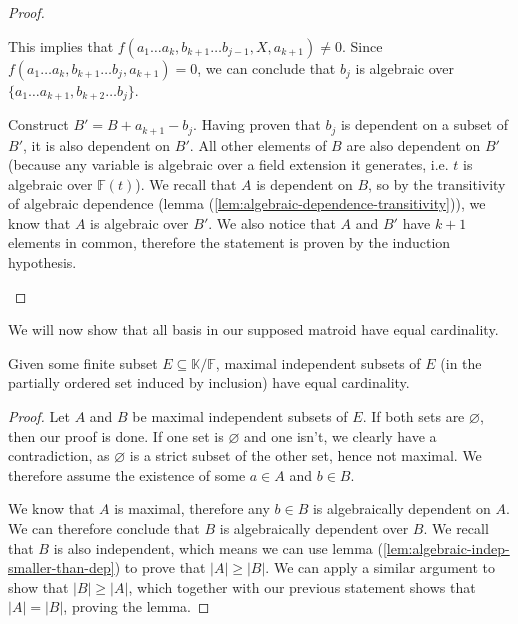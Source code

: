 \begin{proof}
\begin{enumerate}
		      This implies that $f(a _1 \ldots a _k, b _{k + 1} \ldots b _{j - 1}, X, a _{k + 1}) \neq 0$. Since $ f(a _1 \ldots a _{k}, b _{k + 1} \ldots b _{j}, a _{k + 1})  = 0$, we can conclude that $b_j$ is algebraic over $\{a _1 \ldots a _{k + 1}, b _{k + 2} \ldots b _j\}$.

		      Construct $B' = B + a _{k + 1} - b_j$. Having proven that $b_j$ is dependent on a subset of $B'$, it is also dependent on $B'$. All other elements of $B$ are also dependent on $B'$ (because any variable is algebraic over a field extension it generates, i.e. $t$ is algebraic over $\mathbb F(t)$). We recall that $A$ is dependent on $B$, so by the transitivity of algebraic dependence (lemma (\ref{lem:algebraic-dependence-transitivity})), we know that $A$ is algebraic over $B'$. We also notice that $A$ and $B'$ have $k + 1$ elements in common, therefore the statement is proven by the induction hypothesis.
	\end{enumerate}
\end{proof}

We will now show that all basis in our supposed matroid have equal cardinality.

\begin{lemma}
	Given some finite subset $E \subseteq \mathbb K / \mathbb F$, maximal independent subsets of $E$ (in the partially ordered set induced by inclusion) have equal cardinality.
\end{lemma}

\begin{proof}
	Let $A$ and $B$ be maximal independent subsets of $E$. If both sets are $\varnothing$, then our proof is done. If one set is $\varnothing$ and one isn't, we clearly have a contradiction, as $\varnothing$ is a strict subset of the other set, hence not maximal. We therefore assume the existence of some $a \in A$ and $b \in B$.

	We know that $A$ is maximal, therefore any $b \in B$ is algebraically dependent on $A$. We can therefore conclude that $B$ is algebraically dependent over $B$. We recall that $B$ is also independent, which means we can use lemma (\ref{lem:algebraic-indep-smaller-than-dep}) to prove that $|A| \geq |B|$. We can apply a similar argument to show that $|B| \geq |A|$, which together with our previous statement shows that $|A| = |B|$, proving the lemma.
\end{proof}

